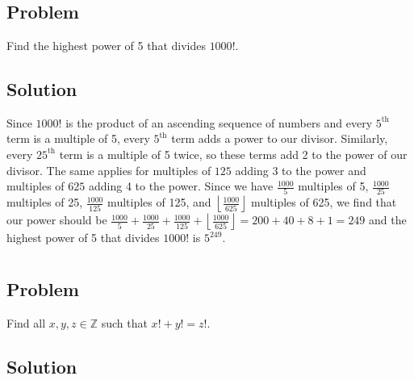 \documentclass[12pt]{article}
\newcommand{\floor}[1]{\left\lfloor #1 \right\rfloor}
\newcommand{\Z}    [0]{\mathbb{Z}                   }
\begin{document}
\section{}

\subsection{Problem}
Find the highest power of 5 that divides $1000!$.

\subsection{Solution}
Since $1000!$ is the product of an ascending sequence of numbers and every $5^\text{th}$ term is a multiple of 5, every $5^\text{th}$ term adds a power to our divisor. Similarly, every $25^\text{th}$ term is a multiple of 5 twice, so these terms add 2 to the power of our divisor. The same applies for multiples of $125$ adding 3 to the power and multiples of $625$ adding 4 to the power. Since we have $\frac{1000}{5}$ multiples of 5, $\frac{1000}{25}$ multiples of 25, $\frac{1000}{125}$ multiples of 125, and $\floor{\frac{1000}{625}}$ multiples of 625, we find that our power should be $\frac{1000}{5} + \frac{1000}{25} + \frac{1000}{125} + \floor{\frac{1000}{625}} = 200 + 40 + 8 + 1 = 249$ and the highest power of 5 that divides $1000!$ is $\boxed{5^{249}}$.



\section{}

\subsection{Problem}
Find all $x, y, z \in \Z$ such that $x! + y! = z!$.

\subsection{Solution}
\end{document}
